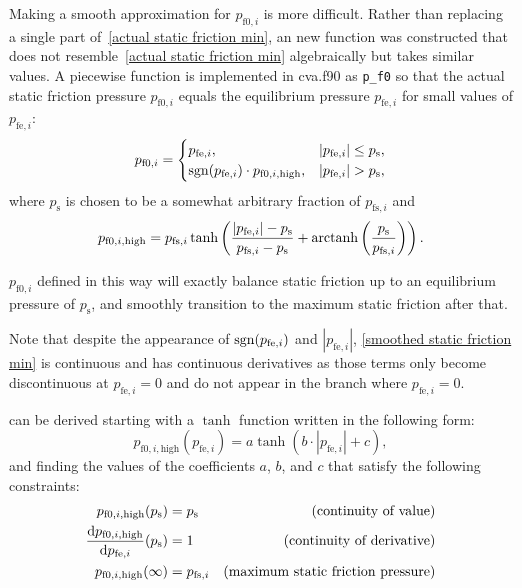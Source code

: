 Making a smooth approximation for $p_{\text{f0},i}$ is more difficult.
Rather than replacing a single part of~\eqref{actual static friction min}, an new function was constructed that does not resemble~\eqref{actual static friction min} algebraically but takes similar values.
A piecewise function is implemented in cva.f90 as \texttt{p\_f0} so that the actual static friction pressure $p_{\text{f0},i}$ equals the equilibrium pressure $p_{\text{fe},i}$ for small values of $p_{\text{fe},i}$:
\begin{equation}
    p_{\text{f0},i} =
    \begin{cases} 
        p_{\text{fe},i},                                         & |p_{\text{fe},i}| \leq p_\text{s}, \\
        \operatorname{sgn}(p_{\text{fe},i}) \cdot p_{\text{f0},i,\text{high}}, & |p_{\text{fe},i}| >    p_\text{s},
    \end{cases}\label{eq:smoothed static friction min}
\end{equation}
where $p_\text{s}$ is chosen to be a somewhat arbitrary fraction of $p_{\text{fs},i}$ and
\begin{equation}
    p_{\text{f0},i,\text{high}} = p_{\text{fs},i} \tanh\left(\frac{|p_{\text{fe},i}| - p_\text{s}}{p_{\text{fs},i} - p_\text{s}} + \operatorname{arctanh}\left(\frac{p_\text{s}}{p_{\text{fs},i}}\right)\right). \label{eq:smoothed static friction min high}
\end{equation}

$p_{\text{f0},i}$ defined in this way will exactly balance static friction up to an equilibrium pressure of $p_\text{s}$, and smoothly transition to the maximum static friction after that.

Note that despite the appearance of $\operatorname{sgn}(p_{\text{fe},i})$ and $|p_{\text{fe},i}|$,
\eqref{smoothed static friction min} %
is continuous and has continuous derivatives as those terms only become discontinuous at $p_{\text{fe},i} = 0$ and do not appear in the branch where $p_{\text{fe},i} = 0$.

 can be derived starting with a $\tanh$ function written in the following form:
\begin{equation}
    p_{\text{f0},i,\text{high}}(p_{\text{fe},i}) = a \tanh(b \cdot |p_{\text{fe},i}| + c),
\end{equation}
and finding the values of the coefficients $a$, $b$, and $c$ that satisfy the following constraints:
\begin{align}
    p_{\text{f0},i,\text{high}}(p_\text{s})                         &= p_\text{s}      &\text{(continuity of value)} \\
    {\dv{p_{\text{f0},i,\text{high}}}{p_{\text{fe},i}}}(p_\text{s}) &= 1               &\text{(continuity of derivative)} \\
    p_{\text{f0},i,\text{high}}(\infty)                             &= p_{\text{fs},i} &\text{(maximum static friction pressure)}
\end{align}

